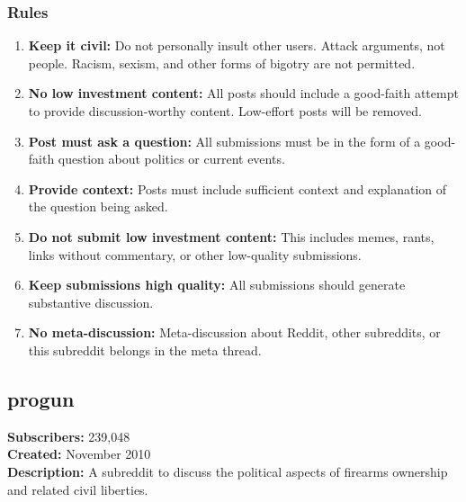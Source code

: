 \subsubsection{Rules}
\begin{enumerate}
    \item \textbf{Keep it civil:} Do not personally insult other users. Attack arguments, not people. Racism, sexism, and other forms of bigotry are not permitted.
    
    \item \textbf{No low investment content:} All posts should include a good-faith attempt to provide discussion-worthy content. Low-effort posts will be removed.
    
    \item \textbf{Post must ask a question:} All submissions must be in the form of a good-faith question about politics or current events.
    
    \item \textbf{Provide context:} Posts must include sufficient context and explanation of the question being asked.
    
    \item \textbf{Do not submit low investment content:} This includes memes, rants, links without commentary, or other low-quality submissions.
    
    \item \textbf{Keep submissions high quality:} All submissions should generate substantive discussion.
    
    \item \textbf{No meta-discussion:} Meta-discussion about Reddit, other subreddits, or this subreddit belongs in the meta thread.
\end{enumerate}

\subsection{progun}
\textbf{Subscribers:} 239,048 \\
\textbf{Created:} November 2010 \\
\textbf{Description:} A subreddit to discuss the political aspects of firearms ownership and related civil liberties.

